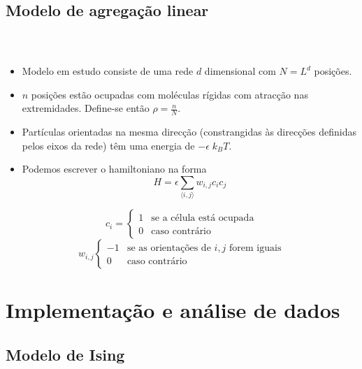 \documentclass[11pt]{beamer}
\begin{document}
\subsection{Modelo de agregação linear}
\begin{frame}
\frametitle{\insertsection \\ {\small \insertsubsection}}
\begin{itemize}
\item Modelo em estudo consiste de uma rede $d$ dimensional com $N=L^d$ posições.
\item $n$ posições estão ocupadas com moléculas rígidas com atracção nas extremidades. Define-se então $\rho = \frac{n}{N}$.
\item Partículas orientadas na mesma direcção (constrangidas às direcções definidas pelos eixos da rede) têm uma energia de $-\epsilon \; k_B T$.
\item Podemos escrever o hamiltoniano na forma
\begin{equation}
	H = \epsilon\sum_{\langle i,j \rangle} w_{i,j} c_i c_j
\end{equation}
\end{itemize}
\footnotesize
$$
c_i=
\begin{cases}
1&\text{se a célula está ocupada}\\
0&\text{caso contrário}
\end{cases}
$$
$$
w_{i,j}
\begin{cases}
-1&\text{se as orientações de $i,j$ forem iguais}\\
0&\text{caso contrário}
\end{cases}
$$

\normalsize
\end{frame}

\section{Implementação e análise de dados}
\subsection{Modelo de Ising}
\end{document}
